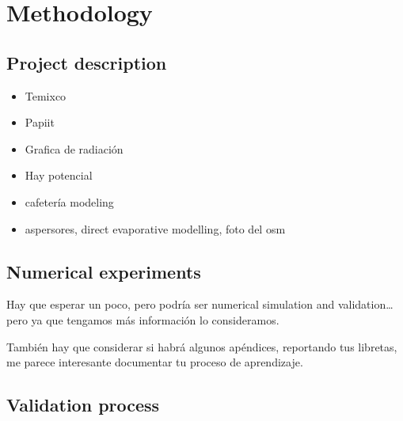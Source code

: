 \chapter{Methodology}
\label{chap:methodology}

 
 
 \section{Project description}
 
 \begin{itemize}
 	\item Temixco
 	\item Papiit
 	\item Grafica de radiación
 	\item Hay potencial
 	\item cafetería modeling
 	\item aspersores, direct evaporative modelling, foto del osm
 \end{itemize}
 
 
 \section{Numerical experiments}
 
 Hay que esperar un poco, pero podría ser numerical simulation and validation… pero ya que tengamos más información lo consideramos.


También hay que considerar si habrá algunos apéndices, reportando tus libretas, me parece interesante documentar tu proceso de aprendizaje.
 
 \section{Validation process}
 

